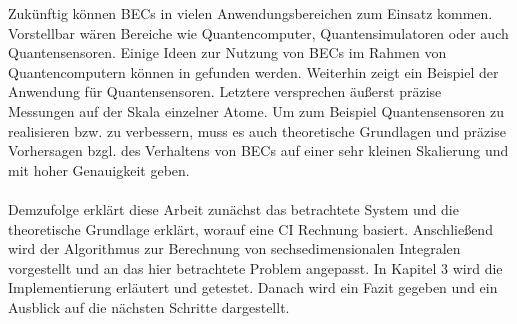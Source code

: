 Zukünftig können BECs  in vielen Anwendungsbereichen zum Einsatz kommen. 
Vorstellbar wären Bereiche wie Quantencomputer, Quantensimulatoren oder auch 
Quantensensoren. Einige Ideen zur Nutzung von BECs im Rahmen von 
Quantencomputern können in \cite{phdthesis:Schneider} 
gefunden werden. Weiterhin 
zeigt \cite{av:m5} ein Beispiel der Anwendung für Quantensensoren.
Letztere versprechen äußerst präzise Messungen auf der Skala einzelner Atome.
Um zum Beispiel Quantensensoren zu realisieren bzw. zu 
verbessern, muss es auch 
theoretische Grundlagen und präzise Vorhersagen bzgl. des Verhaltens von BECs 
auf einer sehr kleinen Skalierung und mit hoher Genauigkeit geben.\\
\ \\[1cm]
Demzufolge erklärt diese Arbeit zunächst das betrachtete System und die 
theoretische Grundlage erklärt, worauf eine CI Rechnung 
basiert. Anschließend 
wird der Algorithmus zur Berechnung von sechsedimensionalen Integralen 
vorgestellt und an das hier betrachtete Problem angepasst. In Kapitel 3 wird 
die Implementierung erläutert und getestet. Danach wird ein 
Fazit gegeben 
und ein Ausblick auf die nächsten Schritte dargestellt.
